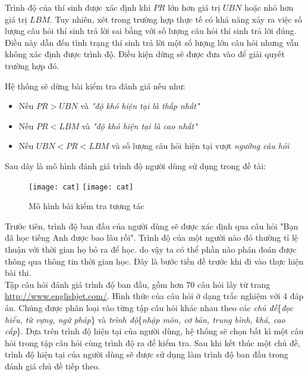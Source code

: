 Trình độ của thí sinh được xác định khi $PR$ lớn hơn giá trị $UBN$ hoặc nhỏ hơn giá trị $LBM$. Tuy nhiên, xét trong trường hợp thực tế có khả năng xảy ra việc số lượng câu hỏi thí sinh trả lời sai bằng với số lượng câu hỏi thí sinh trả lời đúng. Điều này dẫn đến tình trạng thí sinh trả lời một số lượng lớn câu hỏi nhưng vẫn không xác định được trình độ. Điều kiện dừng sẽ được đưa vào để giải quyết trường hợp đó.

Hệ thống sẽ dừng bài kiểm tra đánh giá nếu như:
\begin{itemize}
	\item Nếu $PR > UBN$ và \textit{"độ khó hiện tại là thấp nhất"}
	\item Nếu $PR < LBM$ và \textit{"độ khó hiện tại là cao nhất"}
	\item Nếu $UBN < PR < LBM$ và số lượng câu hỏi hiện tại vượt \textit{ngưỡng câu hỏi}
\end{itemize}

Sau dây là mô hình đánh giá trình độ người dùng sử dụng trong đề tài:

\begin{figure}[H]
  \begin{center}
    \ifpdf
      \texttt{[image: cat]}
    \else
      \texttt{[image: cat]}
    \fi
    \caption{Mô hình bài kiểm tra tương tác}
    \label{CATModel}
  \end{center}
\end{figure}

Trước tiên, trình độ ban đầu của người dùng sẽ được xác định qua câu hỏi "Bạn đã học tiếng Anh được bao lâu rồi". Trình độ của một người nào đó thường tỉ lệ thuận với thời gian họ bỏ ra để học.  do vậy ta có thể phần nào phán đoán được thông qua thông tin thời gian học. Đây là bước tiền đề trước khi đi vào thực hiện bài thi.\\

Tập câu hỏi đánh giá trình độ ban đầu, gồm hơn 70 câu hỏi lấy từ trang \url{http://www.englishjet.com/}. Hình thức của câu hỏi ở dạng trắc nghiệm với 4 đáp án. Chúng được phân loại vào từng tập câu hỏi khác nhau theo các \textit{chủ đề}\{\textit{đọc hiểu, từ vựng, ngữ pháp}\} và \textit{trình độ}\{\textit{nhập môn, cơ bản, trung bình, khá, cao cấp}\}. Dựa trên trình độ hiện tại của người dùng, hệ thống sẽ chọn bất kì một câu hỏi trong tập câu hỏi cùng trình độ ra để kiểm tra. Sau khi kết thúc một chủ đề, trình độ hiện tại của người dùng sẽ được sử dụng làm trình độ ban đầu trong đánh giá chủ đề tiếp theo. \\

